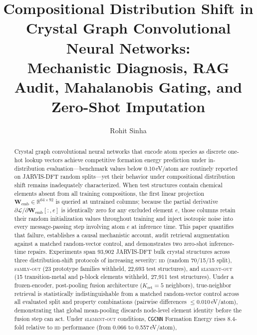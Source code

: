 \documentclass[final,5p,twocolumn,10pt]{elsarticle}
\newcommand{\mae}{\text{MAE}}
\newcommand{\iid}{\textsc{iid}}
\newcommand{\famout}{\textsc{family-out}}
\newcommand{\elout}{\textsc{element-out}}
\newcommand{\cgcnn}{\texttt{CGCNN}}
\begin{document}
\begin{frontmatter}

\title{Compositional Distribution Shift in Crystal Graph Convolutional Neural Networks:\\Mechanistic Diagnosis, RAG Audit, Mahalanobis Gating, and Zero-Shot Imputation}

\author[inst1]{Rohit Sinha}
\address[inst1]{Government Engineering College Jagdalpur, Jagdalpur, Chhattisgarh, 494005, India}

\begin{abstract}
Crystal graph convolutional neural networks that encode atom species as discrete
one-hot lookup vectors achieve competitive formation energy prediction under
in-distribution evaluation---benchmark \mae{} values below 0.10\,eV/atom are
routinely reported on JARVIS-DFT random splits---yet their behavior under
compositional distribution shift remains inadequately characterized.
When test structures contain chemical elements absent from all training
compositions, the first linear projection $\bm{W}_{\text{emb}} \in \mathbb{R}^{64 \times 92}$
is queried at untrained columns; because the partial derivative
$\partial \mathcal{L}/\partial \bm{W}_{\text{emb}}[:,e]$
is identically zero for any excluded element $e$, those columns retain
their random initialization values throughout training and inject isotropic noise
into every message-passing step involving atom $e$ at inference time.
This paper quantifies that failure, establishes a causal mechanistic account,
audit retrieval augmentation against a matched random-vector control,
and demonstrates two zero-shot inference-time repairs.
Experiments span 93,902 JARVIS-DFT bulk crystal structures across three
distribution-shift protocols of increasing severity: \iid{} (random 70/15/15 split),
\famout{} (23 prototype families withheld, 22,693 test structures),
and \elout{} (15 transition-metal and p-block elements withheld, 27,911 test structures).
Under a frozen-encoder, post-pooling fusion architecture ($K_\text{ret}=5$ neighbors),
true-neighbor retrieval is statistically indistinguishable from a matched random-vector
control across all evaluated split and property combinations
(pairwise \mae{} differences $\le 0.010$\,eV/atom), demonstrating that global
mean-pooling discards node-level element identity before the fusion step can act.
Under \elout{} conditions, \cgcnn{} Formation Energy \mae{} rises
8.4-fold relative to \iid{} performance (from 0.066 to 0.557\,eV/atom),

\end{abstract}
\end{frontmatter}
\end{document}
